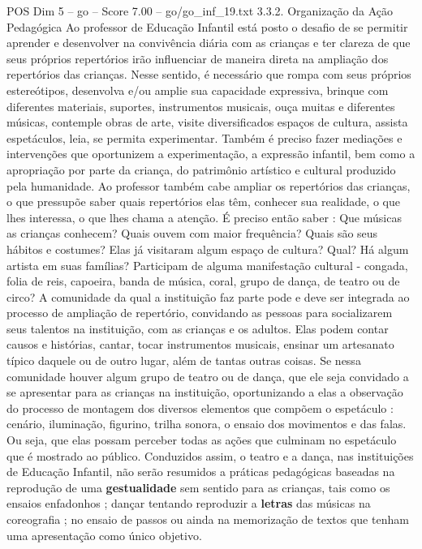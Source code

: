 \begin{textsample}{POS Dim 5 – go – Score 7.00 – go/go\_inf\_19.txt}  \label{ex:f5_pos_009}
3.3.2.
Organização da Ação Pedagógica Ao professor de Educação Infantil está posto o desafio de se permitir aprender e desenvolver na convivência diária com as crianças e ter clareza de que seus próprios repertórios irão influenciar de maneira direta na ampliação dos repertórios das crianças.
Nesse sentido, é necessário que rompa com seus próprios estereótipos, desenvolva e/ou amplie sua capacidade expressiva, brinque com diferentes materiais, suportes, instrumentos musicais, ouça muitas e diferentes músicas, contemple obras de arte, visite diversificados espaços de cultura, assista espetáculos, leia, se permita experimentar.
Também é preciso fazer mediações e intervenções que oportunizem a experimentação, a expressão infantil, bem como a apropriação por parte da criança, do patrimônio artístico e cultural produzido pela humanidade.
Ao professor também cabe ampliar os repertórios das crianças, o que pressupõe saber quais repertórios elas têm, conhecer sua realidade, o que lhes interessa, o que lhes chama a atenção.
É preciso então saber : Que músicas as crianças conhecem?
Quais ouvem com maior frequência?
Quais são seus hábitos e costumes?
Elas já visitaram algum espaço de cultura?
Qual?
Há algum artista em suas famílias?
Participam de alguma manifestação cultural - congada, folia de reis, capoeira, banda de música, coral, grupo de dança, de teatro ou de circo?
A comunidade da qual a instituição faz parte pode e deve ser integrada ao processo de ampliação de repertório, convidando as pessoas para socializarem seus talentos na instituição, com as crianças e os adultos.
Elas podem contar causos e histórias, cantar, tocar instrumentos musicais, ensinar um artesanato típico daquele ou de outro lugar, além de tantas outras coisas.
Se nessa comunidade houver algum grupo de teatro ou de dança, que ele seja convidado a se apresentar para as crianças na instituição, oportunizando a elas a observação do processo de montagem dos diversos elementos que compõem o espetáculo : cenário, iluminação, figurino, trilha sonora, o ensaio dos movimentos e das falas.
Ou seja, que elas possam perceber todas as ações que culminam no espetáculo que é mostrado ao público.
Conduzidos assim, o teatro e a dança, nas instituições de Educação Infantil, não serão resumidos a práticas pedagógicas baseadas na reprodução de uma \textbf{gestualidade} sem sentido para as crianças, tais como os ensaios enfadonhos ; dançar tentando reproduzir a \textbf{letras} das músicas na coreografia ; no ensaio de passos ou ainda na memorização de textos que tenham uma apresentação como único objetivo.

\end{textsample}
